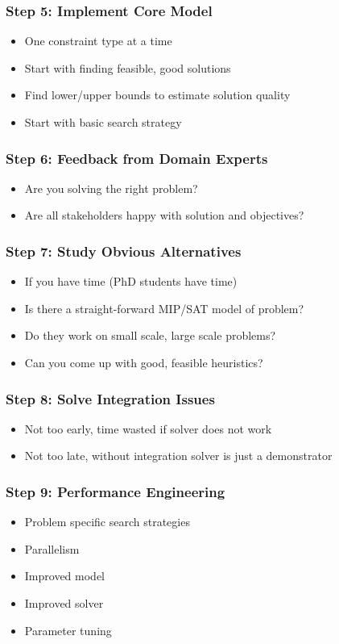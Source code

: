 \begin{frame}
\frametitle{Step 5: Implement Core Model}
\begin{itemize}
\item One constraint type at a time
\item Start with finding feasible, good solutions
\item Find lower/upper bounds to estimate solution quality
  \item Start with basic search strategy
\end{itemize}
\end{frame}

\begin{frame}
\frametitle{Step 6: Feedback from Domain Experts}
\begin{itemize}
\item Are you solving the right problem?
  \item Are all stakeholders happy with solution and objectives?
\end{itemize}
\end{frame}

\begin{frame}
\frametitle{Step 7: Study Obvious Alternatives}
\begin{itemize}
\item If you have time (PhD students have time)
\item Is there a straight-forward MIP/SAT model of problem?
\item Do they work on small scale, large scale problems?
\item Can you come up with good, feasible heuristics?
\end{itemize}
\end{frame}

\begin{frame}
\frametitle{Step 8: Solve Integration Issues}
\begin{itemize}
\item Not too early, time wasted if solver does not work
\item Not too late, without integration solver is just a demonstrator
\end{itemize}
\end{frame}

\begin{frame}
\frametitle{Step 9: Performance Engineering}
\begin{itemize}
\item Problem specific search strategies
\item Parallelism
\item Improved model
\item Improved solver
  \item Parameter tuning
\end{itemize}
\end{frame}


